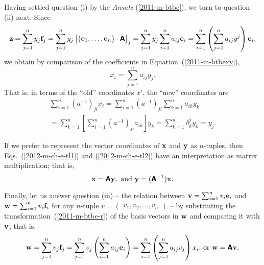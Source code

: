 Having settled question (i) by the {\it Ansatz}
(\ref{2011-m-btbe}),
we turn to question (ii) next.
Since
\begin{equation}
{\bf z} =
 \sum_{j=1}^n y_j {\bf f}_j=
 \sum_{j=1}^n  y_j \left[\begin{pmatrix}{\bf e}_1,\ldots ,{\bf e}_n\end{pmatrix} \cdot \textsf{\textbf{A}}\right]_j=
 \sum_{j=1}^n  y_j  \sum_{i=1}^n a_{ij} {\bf e}_i=
  \sum_{i=1}^n \left(\sum_{j=1}^n  a_{ij} y^j \right)   {\bf e}_i;
\end{equation}
we obtain by comparison of the coefficients in Equation~(\ref{2011-m-btbexy}),
\begin{equation}
x_i= \sum_{j=1}^n a_{ij} y_j.
\label{2012-m-ch-e-tl1}
\end{equation}
That is, in terms of the ``old'' coordinates $x^i$,
the ``new'' coordinates are
\begin{equation}
\begin{split}
\sum_{i=1}^n (a^{-1})_{ji} x_i= \sum_{i=1}^n (a^{-1})_{ji}  \sum_{k=1}^n  a_{ik} y_k \\
=  \sum_{k=1}^n \left[ \sum_{i=1}^n (a^{-1})_{ji}  a_{ik} \right] y_k
=   \sum_{k=1}^n \delta^j_k y_k
=  y_j
.
\label{2012-m-ch-e-tl2}
\end{split}
\end{equation}

If we prefer to represent the vector coordinates of
${\bf x}$ and ${\bf y}$ as $n$-tuples,
then Eqs.~(\ref{2012-m-ch-e-tl1})  and (\ref{2012-m-ch-e-tl2})
have an interpretation as matrix multiplication; that is,
\begin{equation}
{\bf x} =  \textsf{\textbf{A}}{\bf y}, {\text{ and }}
{\bf y} =  (\textsf{\textbf{A}}^{-1}){\bf x}
.
\label{2012-m-ch-e-tl3}
\end{equation}

Finally, let us answer question (iii)
-- the relation between ${\bf v}=\sum_{i=1}^n v_i {\bf e}_i$ and ${\bf w}=\sum_{i=1}^n v_i {\bf f}_i$ for any $n$-tuple
$v = \begin{pmatrix} v_1, v_2, \ldots , v_n \end{pmatrix}$ --
by substituting the transformation~(\ref{2011-m-btbe-r}) of the basis vectors in ${\bf w}$ and comparing it with ${\bf v}$; that is,
\begin{equation}
{\bf w}= \sum_{j=1}^n v_j {\bf f}_j  = \sum_{j=1}^n v_j \left( \sum_{i=1}^n a_{ij} {\bf e}_i \right)= \sum_{i=1}^n \left( \sum_{j=1}^n a_{ij}  v_j \right)  x_i
\textrm{;  or } {\bf w} = \textsf{\textbf{A}} {\bf v}.
\end{equation}

